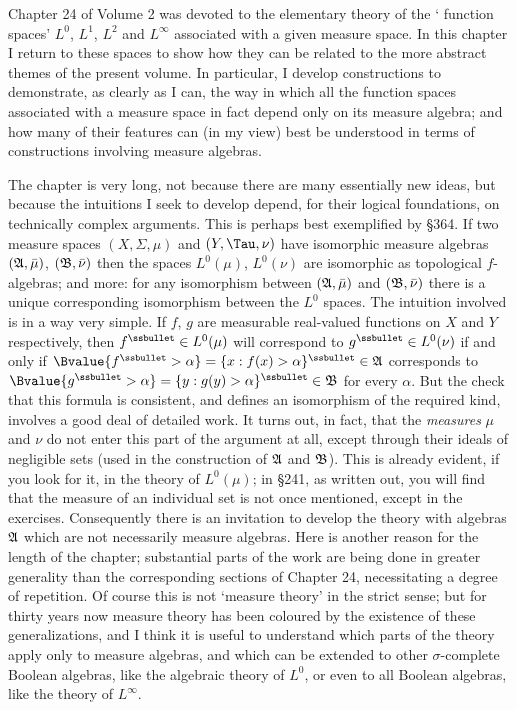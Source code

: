
\def\chaptername{Function Spaces}
\def\sectionname{Introduction}


Chapter 24 of Volume 2 was devoted to the elementary theory of the \lq
function spaces' $L^0$, $L^1$, $L^2$ and $L^{\infty}$ associated with a
given measure space.
In this chapter I return to these spaces to show how they can be related
to the more abstract themes of the present volume.   In particular, I
develop constructions to demonstrate, as clearly as I can, the way in
which all the function spaces associated with a measure space in fact
depend only on its measure algebra;  and how many of their features can
(in my view) best be understood in terms of constructions involving
measure algebras.

The chapter is very long, not because there are many essentially new ideas, but because the intuitions I seek to develop depend,
for their logical foundations, on technically complex arguments.   This
is perhaps best exemplified by \S364.   If two measure spaces
$(X,\Sigma,\mu)$ and $(Y,\Tau,\nu)$ have isomorphic measure algebras
$(\frak A,\bar\mu)$, $(\frak B,\bar\nu)$ then the spaces $L^0(\mu)$,
$L^0(\nu)$ are isomorphic as topological $f$-algebras;  and more:  for
any isomorphism between $(\frak A,\bar\mu)$ and $(\frak B,\bar\nu)$
there is a unique corresponding isomorphism between the $L^0$ spaces.
The intuition involved is in a way very simple.   If $f$, $g$ are
measurable real-valued functions on $X$ and $Y$ respectively, then
$f^{\ssbullet}\in L^0(\mu)$ will correspond to $g^{\ssbullet}\in
L^0(\nu)$ if and only if
$\Bvalue{f^{\ssbullet}>\alpha}=\{x:f(x)>\alpha\}^{\ssbullet}\in\frak A$
corresponds to
$\Bvalue{g^{\ssbullet}>\alpha}=\{y:g(y)>\alpha\}^{\ssbullet}\in\frak B$
for every $\alpha$.
But the check that this formula is consistent, and defines an
isomorphism of the required kind, involves a good deal of detailed work.
It turns out, in fact, that the {\it measures} $\mu$ and $\nu$ do not
enter this part of the argument at all, except through their ideals of
negligible sets (used in the construction of $\frak A$ and $\frak B$).
This is already evident, if you look for it, in the theory of
$L^0(\mu)$;  in \S241, as written out, you will find that the measure of an individual set is not once mentioned, except in the exercises.
Consequently there is an invitation to develop the theory with algebras
$\frak A$ which are not necessarily measure algebras.   Here is another
reason for the length of the chapter;  substantial parts of the work are
being done in greater generality than the corresponding sections of
Chapter 24, necessitating a degree of repetition.   Of course this is
not \lq measure theory' in the strict sense;  but for thirty years now
measure theory has been coloured by the existence of these
generalizations, and I think it is useful to understand which parts
of the theory apply only to measure algebras, and which can be extended
to other $\sigma$-complete Boolean algebras, like the algebraic theory
of $L^0$, or even to all Boolean algebras, like the theory of
$L^{\infty}$.

